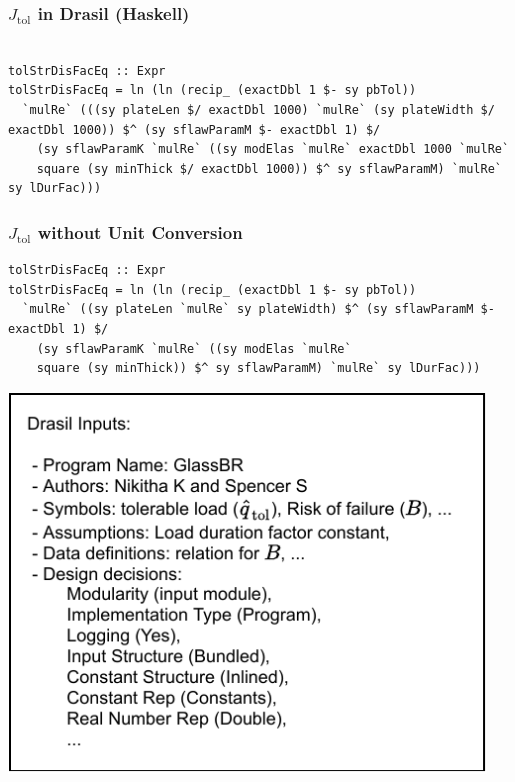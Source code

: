 \documentclass{beamer}
\begin{document}

\begin{frame}

\frametitle{$J_{\mbox{tol}}$ in Drasil (Haskell)}

\begin{lstlisting}

tolStrDisFacEq :: Expr
tolStrDisFacEq = ln (ln (recip_ (exactDbl 1 $- sy pbTol))
  `mulRe` (((sy plateLen $/ exactDbl 1000) `mulRe` (sy plateWidth $/ exactDbl 1000)) $^ (sy sflawParamM $- exactDbl 1) $/
    (sy sflawParamK `mulRe` ((sy modElas `mulRe` exactDbl 1000 `mulRe`
    square (sy minThick $/ exactDbl 1000)) $^ sy sflawParamM) `mulRe` sy lDurFac)))

\end{lstlisting}
\end{frame}


\begin{frame}

\frametitle{$J_{\mbox{tol}}$ without Unit Conversion}

\begin{lstlisting}
tolStrDisFacEq :: Expr
tolStrDisFacEq = ln (ln (recip_ (exactDbl 1 $- sy pbTol))
  `mulRe` ((sy plateLen `mulRe` sy plateWidth) $^ (sy sflawParamM $- exactDbl 1) $/
    (sy sflawParamK `mulRe` ((sy modElas `mulRe`
    square (sy minThick)) $^ sy sflawParamM) `mulRe` sy lDurFac)))
\end{lstlisting}
\end{frame}


\begin{frame}


\includegraphics[width=0.95\textwidth]{../figures/DrasilInputs.pdf}

\end{frame}
\end{document}
